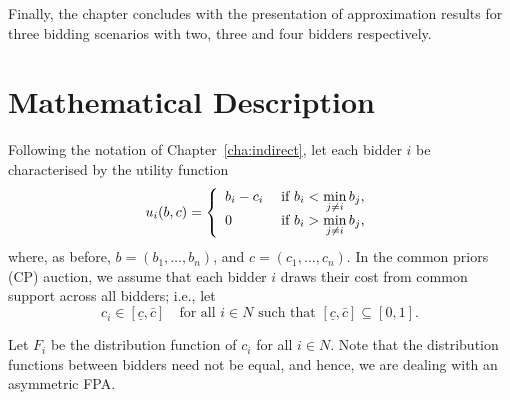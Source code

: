 Finally, the chapter concludes with the presentation of approximation results for three bidding scenarios with two, three and four bidders respectively.

\section{Mathematical Description} %
\label{sec:mathematical_description_approximation}

Following the notation of Chapter~\ref{cha:indirect}, let each bidder $i$ be characterised by the utility function
\begin{equation}
  \label{eq:utility_approximation}
    u_i(b,c) = \left\{
  \begin{array}{l l}
    b_i-c_i & \;\text{if } b_i < \displaystyle\min_{j\neq i}b_j,\\
    0 & \;\text{if } b_i > \displaystyle\min_{j\neq i}b_j,
  \end{array}\right.
\end{equation}
where, as before, $b = (b_1,\ldots,b_n)$, and $c = (c_1,\ldots,c_n)$. In the common priors (CP) auction, we assume that each bidder $i$ draws their cost from common support across all bidders; i.e., let
\begin{equation*}
  c_i\in [\underline{c}, \bar{c}] \quad\text{for all } i\in N \text{ such that } [\underline{c}, \bar{c}]\subseteq [0, 1].
\end{equation*}

Let $F_i$ be the distribution function of $c_i$ for all $i\in N$. Note that the distribution functions between bidders need not be equal, and hence, we are dealing with an asymmetric FPA.

